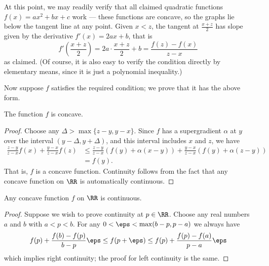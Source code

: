 At this point, we may readily verify that all claimed
quadratic functions $f(x) = ax^2+bx+c$ work --- these functions are concave,
so the graphs lie below the tangent line at any point.
Given $x < z$, the tangent at $\frac{x+z}{2}$ has slope
given by the derivative $f'(x)=2ax+b$, that is
\[ f'\left(\frac{x+z}{2}\right) = 2a \cdot \frac{x+z}{2} + b
  = \frac{f(z)-f(x)}{z-x} \]
as claimed.
(Of course, it is also easy to verify the condition directly
by elementary means, since it is just a polynomial inequality.)

Now suppose $f$ satisfies the required condition; we prove that it has
the above form.

\begin{claim*}
  The function $f$ is concave.
\end{claim*}
\begin{proof}
  Choose any $\Delta > \max\{z-y,y-x\}$.
  Since $f$ has a supergradient $\alpha$ at $y$ over the interval
  $(y-\Delta,y+\Delta)$, and this interval includes $x$ and $z$, we have
  \begin{align*}
  \frac{z-y}{z-x}f(x) + \frac{y-x}{z-x}f(z) &\leq
  \frac{z-y}{z-x}(f(y) + \alpha(x-y)) + \frac{y-x}{z-x}(f(y) +
  \alpha(z-y)) \\
  &= f(y).
  \end{align*}
  That is, $f$ is a concave function.
  Continuity follows from the fact that any concave
  function on $\RR$ is automatically continuous.
\end{proof}

\begin{lemma*}
  Any concave function $f$ on $\RR$ is continuous.
\end{lemma*}
\begin{proof}
  Suppose we wish to prove continuity at $p \in \RR$.
  Choose any real numbers $a$ and $b$ with $a < p < b$.
  For any $0 < \eps < \max(b-p,p-a)$ we always have
  \[ f(p) + \frac{f(b)-f(p)}{b-p} \eps \le f(p+\eps) \le f(p) + \frac{f(p)-f(a)}{p-a} \eps \]
  which implies right continuity; the proof for left continuity is the same.
\end{proof}

